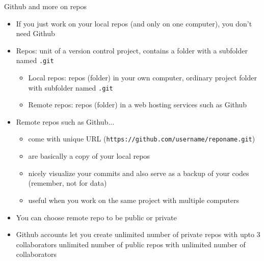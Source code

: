 \documentclass[handout,pdftex,10pt,aspectratio=169]{beamer}
\begin{document}
\begin{frame}{Github and more on repos}
  \begin{itemize}[<+->]%
    \item If you just work on your local repos (and only on one computer), you don't need Github
    \item Repos: unit of a version control project,
    contains a folder with a subfolder named \texttt{.git}
    \begin{itemize}
      \item Local repos: repos (folder) in your own computer, ordinary project folder with subfolder named \texttt{.git}
      \item Remote repos: repos (folder) in a web hosting services such as Github
    \end{itemize}
    \item Remote repos such as Github...
    \begin{itemize}
      \item come with unique URL (\texttt{https://github.com/username/reponame.git})
      \item are basically a copy of your local repos
      \item nicely visualize your commits
      and also serve as a backup of your codes (remember, not for data)
      \item useful when you work on the same project with multiple computers
    \end{itemize}
    \item You can choose remote repo to be public or private
    \item Github accounts let you create unlimited number of private repos
    with upto 3 collaborators unlimited number of public repos with unlimited number of collaborators
  \end{itemize}
\end{frame}
\end{document}
